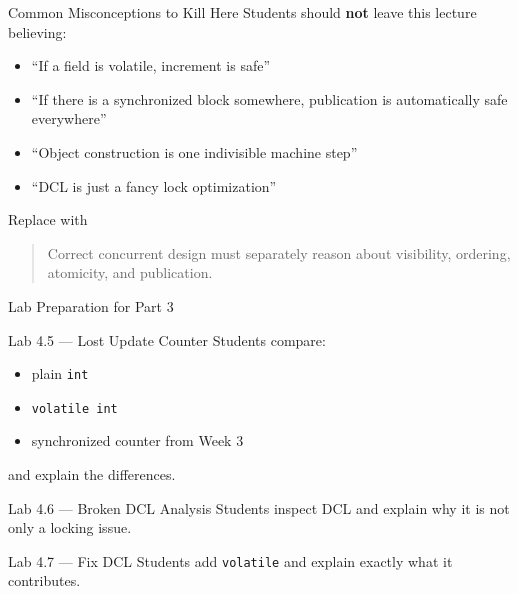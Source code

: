 \documentclass[aspectratio=169,11pt]{beamer}
\begin{document}
	\begin{frame}{Common Misconceptions to Kill Here}
		Students should \textbf{not} leave this lecture believing:
		
		\begin{itemize}
			\item ``If a field is volatile, increment is safe''
			\item ``If there is a synchronized block somewhere, publication is automatically safe everywhere''
			\item ``Object construction is one indivisible machine step''
			\item ``DCL is just a fancy lock optimization''
		\end{itemize}
		
		\vspace{0.35cm}
		
		\begin{alertblock}{Replace with}
			\begin{quote}
				Correct concurrent design must separately reason about visibility, ordering, atomicity, and publication.
			\end{quote}
		\end{alertblock}
	\end{frame}
	
	\begin{frame}{Lab Preparation for Part 3}
		\begin{block}{Lab 4.5 --- Lost Update Counter}
			Students compare:
			\begin{itemize}
				\item plain \texttt{int}
				\item \texttt{volatile int}
				\item synchronized counter from Week 3
			\end{itemize}
			and explain the differences.
		\end{block}
		
		\vspace{0.25cm}
		
		\begin{block}{Lab 4.6 --- Broken DCL Analysis}
			Students inspect DCL and explain why it is not only a locking issue.
		\end{block}
		
		\vspace{0.25cm}
		
		\begin{block}{Lab 4.7 --- Fix DCL}
			Students add \texttt{volatile} and explain exactly what it contributes.
		\end{block}
	\end{frame}
	
\end{document}
